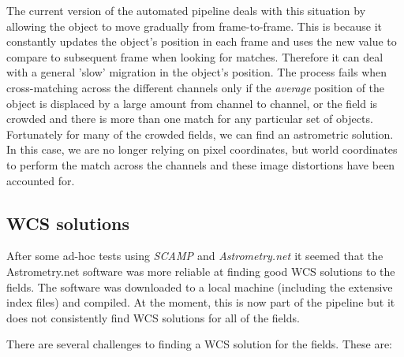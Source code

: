 The current version of the automated pipeline deals with this situation by allowing the object to move gradually from frame-to-frame. This is because it constantly updates the object's position in each frame and uses the new value to compare to subsequent frame when looking for matches. Therefore it can deal with a general 'slow' migration in the object's position. The process fails when cross-matching across the different channels only if the \emph{average} position of the object is displaced by a large amount from channel to channel, or the field is crowded and there is more than one match for any particular set of objects. Fortunately for many of the crowded fields, we can find an astrometric solution. In this case, we are no longer relying on pixel coordinates, but world coordinates to perform the match across the channels and these image distortions have been accounted for. 

\subsection{WCS solutions}\label{sect:astrometry}

After some ad-hoc tests using \emph{SCAMP \cite{scamp}} and \emph{Astrometry.net \cite{astrometry}} it seemed that the Astrometry.net software was more reliable at finding good WCS solutions to the fields. The software was downloaded to a local machine (including the extensive index files) and compiled. At the moment, this is now part of the pipeline but it does not consistently find WCS solutions for all of the fields. 

There are several challenges to finding a WCS solution for the fields.  These are:

